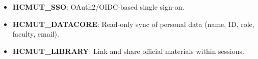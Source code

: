 \begin{itemize}
  \item \textbf{HCMUT\_SSO}: OAuth2/OIDC-based single sign-on.
  \item \textbf{HCMUT\_DATACORE}: Read-only sync of personal data (name, ID, role, faculty, email).
  \item \textbf{HCMUT\_LIBRARY}: Link and share official materials within sessions.
\end{itemize}
